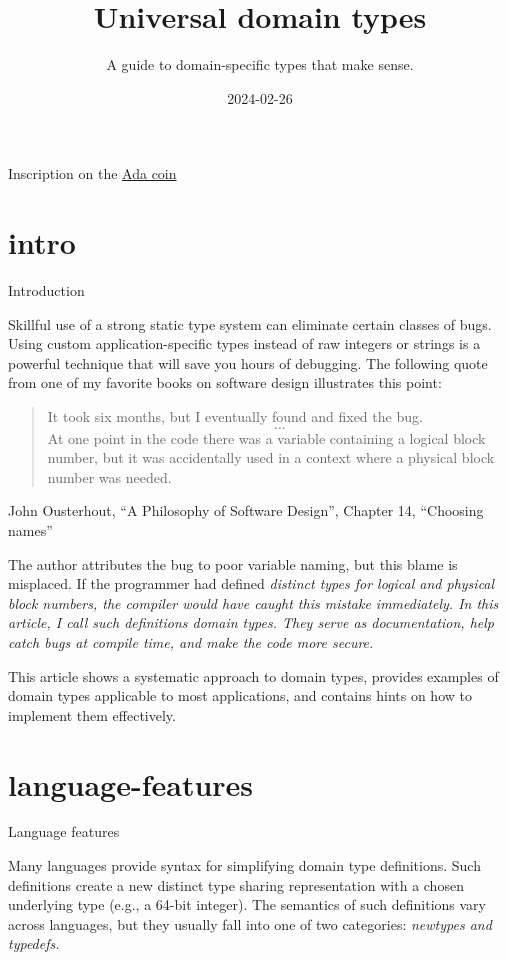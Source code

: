 \documentclass{article}
\title{Universal domain types}
\subtitle{A guide to domain-specific types that make sense.}
\date{2024-02-26}
\begin{document}
\epigraph{
}{Inscription on the \href{https://people.cs.kuleuven.be/~dirk.craeynest/ada-belgium/pictures/ada-strong.html}{Ada coin}}

\section{intro}{Introduction}

Skillful use of a strong static type system can eliminate certain classes of bugs.
Using custom application-specific types instead of raw integers or strings is a powerful technique that will save you hours of debugging.
The following quote from one of my favorite books on software design illustrates this point:

\blockquote{
  It took six months, but I eventually found and fixed the bug. \[\ldots\]
  At one point in the code there was a  variable containing a logical block number, but it was accidentally used in a context where a physical block number was needed.
}{John Ousterhout, ``A Philosophy of Software Design'', Chapter 14, ``Choosing names''}

The author attributes the bug to poor variable naming, but this blame is misplaced.
If the programmer had defined \em{distinct types} for logical and physical block numbers, the compiler would have caught this mistake immediately.
In this article, I call such definitions \em{domain types}.
They serve as documentation, help catch bugs at compile time, and make the code more secure.

This article shows a systematic approach to domain types, provides examples of domain types applicable to most applications, and contains hints on how to implement them effectively.

\section{language-features}{Language features}

Many languages provide syntax for simplifying domain type definitions.
Such definitions create a new distinct type sharing representation with a chosen underlying type (e.g., a 64-bit integer).
The semantics of such definitions vary across languages, but they usually fall into one of two categories: \em{newtypes} and \em{typedefs}.
\end{document}
